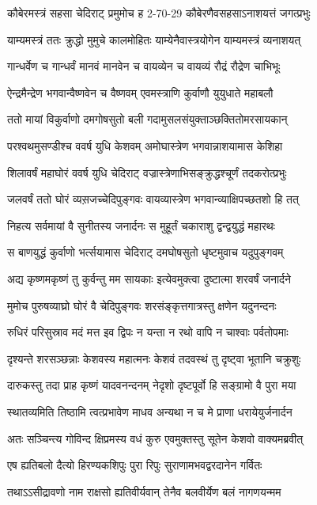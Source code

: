 \twolineshloka
{कौबेरमस्त्रं सहसा चेदिराट् प्रमुमोच ह}
{2-70-29 कौबेरणैवसहसाऽनाशयत्तं जगत्प्रभुः}


\twolineshloka
{याम्यमस्त्रं ततः क्रुद्धो मुमुचे कालमोहितः}
{याम्येनैवास्त्रयोगेन याम्यमस्त्रं व्यनाशयत्}


\twolineshloka
{गान्धर्वेण च गान्धर्वं मानवं मानवेन च}
{वायव्येन च वायव्यं रौद्रं रौद्रेण चाभिभूः}


\twolineshloka
{ऐन्द्रमैन्द्रेण भगवान्वैष्णवेन च वैष्णवम्}
{एवमस्त्राणि कुर्वाणौ युयुधाते महाबलौ}


\twolineshloka
{ततो मायां विकुर्वाणो दमगोषसुतो बली}
{गदामुसलसंयुक्ताञ्छक्तितोमरसायकान्}


\twolineshloka
{परश्वथमुसण्डीश्च ववर्ष युधि केशवम्}
{अमोघास्त्रेण भगवान्नाशयामास केशिहा}


\twolineshloka
{शिलावर्षं महाघोरं ववर्ष युधि चेदिराट्}
{वज्रास्त्रेणाभिसङ्क्रुद्धश्चूर्णं तदकरोत्प्रभुः}


\twolineshloka
{जलवर्षं ततो घोरं व्यस़जच्चेदिपुङ्गवः}
{वायव्यास्त्रेण भगवान्व्याक्षिपच्छतशो हि तत्}


\twolineshloka
{निहत्य सर्वमायां वै सुनीतस्य जनार्दनः}
{स मुहूर्तं चकाराशु द्वन्द्वयुद्धं महारथः}


\twolineshloka
{स बाणयुद्धं कुर्वाणो भर्त्सयामास चेदिराट्}
{दमघोषसुतो धृष्टमुवाच यदुपुङ्गवम्}


\twolineshloka
{अद्य कृष्णमकृष्णं तु कुर्वन्तु मम सायकाः}
{इत्येवमुक्त्वा दुष्टात्मा शरवर्षं जनार्दने}


\twolineshloka
{मुमोच पुरुषव्याघ्रो घोरं वै चेदिपुङ्गवः}
{शरसंङ्कृत्तगात्रस्तु क्षणेन यदुनन्दनः}


\twolineshloka
{रुधिरं परिसुस्राव मदं मत्त इव द्विपः}
{न यन्ता न रथो वापि न चाश्वाः पर्वतोपमाः}


\twolineshloka
{दृश्यन्ते शरसञ्छन्नाः केशवस्य महात्मनः}
{केशवं तदवस्थं तु दृष्ट्वा भूतानि चक्रुशुः}


\twolineshloka
{दारुकस्तु तदा प्राह कृष्णं यादवनन्दनम्}
{नेदृशो दृष्टपूर्वो हि सङ्ग्रामो वै पुरा मया}


\twolineshloka
{स्थातव्यमिति तिष्ठामि त्वत्प्रभावेण माधव}
{अन्यथा न च मे प्राणा धरायेयुर्जनार्दन}


\twolineshloka
{अतः सञ्चिन्त्य गोविन्द क्षिप्रमस्य वधं कुरु}
{एवमुक्तस्तु सूतेन केशवो वाक्यमब्रवीत्}


\twolineshloka
{एष ह्यतिबलो दैत्यो हिरण्यकशिपुः पुरा}
{रिपुः सुराणामभवद्वरदानेन गर्वितः}


\twolineshloka
{तथाऽऽसीद्रावणो नाम राक्षसो ह्यतिवीर्यवान्}
{तेनैव बलवीर्येण बलं नागणयन्मम}


